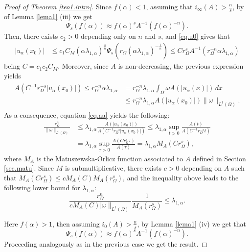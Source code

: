 \documentclass[12pt,reqno]{amsart}
\theoremstyle{definition}
\theoremstyle{remark}
\numberwithin{equation}{section}
\begin{document}
\begin{proof}[Proof of Theorem \ref{teo1.intro}]
Since  $f(\alpha)< 1$, assuming that $i_\infty(A) >\frac{n}{s}$, by  of Lemma \ref{lema1} (iii) we get 
$$
\Psi_s(f(\alpha)) \approx f(\alpha)^s A^{-1} (f(\alpha)^{-n}).
$$
Then, there exists $c_2>0$ depending only on $n$ and $s$, and  \eqref{eq.u0} gives that
\begin{align*}
|u_\alpha(x_0)|&\leq 
c_1 C_M \left( \alpha \lambda_{1,\alpha} \right)^\frac{s}{n} \Psi_s \left(   r_\Omega \left( \alpha \lambda_{1,\alpha}\right)^{-\frac{1}{n}}  \right)\leq 
C r_\Omega ^s A^{-1} \left(   r_\Omega^{-n}\alpha \lambda_{1,\alpha} \right)
\end{align*} 
being $C=c_1 c_2 C_M$. Moreover, since $A$ is non-decreasing, the previous expression yields
\begin{align} \label{eq.aa}
\begin{split}
A(C^{-1} r_\Omega^{-s}     |u_\alpha(x_0)| )\leq
 r_\Omega^{-n} \alpha \lambda_{1,\alpha}&=
  r_\Omega^{-n} \lambda_{1,\alpha} \int_\Omega \omega A(|u_\alpha(x)|)\,dx\\
&\leq 
r_\Omega^{-n} \lambda_{1,\alpha} A(|u_\alpha(x_0)|) \|\omega\|_{L^1(\Omega)}.
\end{split}
\end{align}
As a consequence, equation \eqref{eq.aa} yields the following:
\begin{align*}
\frac{r_\Omega^n}{\|\omega\|_{L^1(\Omega)}} 
&\leq
\lambda_{1,\alpha}   \frac{A(|u_\alpha(x_0)|)}{A(C^{-1} r_\Omega^{-s}     |u_\alpha(x_0)| )}\leq \lambda_{1,\alpha}  \sup_{t>0}
  \frac{A(t)}{A(C^{-1} r_\Omega^{-s}     t )}\\
  &= \lambda_{1,\alpha}  \sup_{\tau >0}
  \frac{A(C r_\Omega^s \tau)}{A(\tau )} = \lambda_{1,\alpha}  M_A(C r_\Omega^s),
\end{align*}
where $M_A$ is the Matuszewska-Orlicz function associated to $A$ defined in Section \ref{sec.matu}. Since $M$ is submultiplicative, there exists $c>0$ depending on $A$ such that $M_A(Cr_\Omega^s)\leq cM_A(C)M_A(r_\Omega^s)$, and the inequality above leads to the following lower bound for $\lambda_{1,\alpha}$:
$$
 \frac{r_\Omega^n}{cM_A(C)|\omega\|_{L^1(\Omega)}} \frac{1}{M_A(r_\Omega^s)} \le \lambda_{1,\alpha} . 
$$

\medskip

 Here $f(\alpha) > 1$, then assuming  $i_0(A) >\frac{n}{s}$, by Lemma \ref{lema1} (iv) we get that
$$
\Psi_s(f(\alpha)) \approx   f(\alpha)^s A^{-1} (f(\alpha)^{-n}).
$$
Proceeding analogously as in the previous case we get the result.
\end{proof}
 
\end{document}
